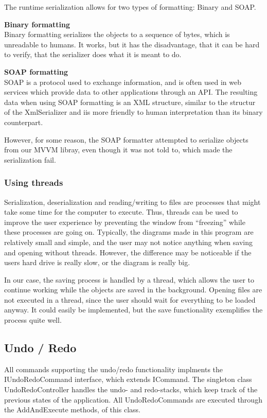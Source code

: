 
The runtime serialization allows for two types of formatting: Binary and SOAP.

\textbf{Binary formatting}\\
Binary formatting serializes the objects to a sequence of bytes, which is unreadable to humans. It works, but it has the disadvantage, that it can be hard to verify, that the serializer does what it is meant to do.

\textbf{SOAP formatting}\\
SOAP is a protocol used to exchange information, and is often used in web services which provide data to other applications through an API. The resulting data when using SOAP formatting is an XML structure, similar to the structur of the XmlSerializer and iis more friendly to human interpretation than its binary counterpart.

However, for some reason, the SOAP formatter attempted to serialize objects from our MVVM libray, even though it was not told to, which made the serialization fail.

\subsubsection{Using threads}
Serialization, deserialization and reading/writing to files are processes that might take some time for the computer to execute. Thus, threads can be used to improve the user experience by preventing the window from “freezing” while these processes are going on. Typically, the diagrams made in this program are relatively small and simple, and the user may not notice anything when saving and opening without threads. However, the difference may be noticeable if the users hard drive is really slow, or the diagram is really big.

In our case, the saving process is handled by a thread, which allows the user to continue working while the objects are saved in the background. Opening files are not executed in a thread, since the user should wait for everything to be loaded anyway. It could easily be implemented, but the save functionality exemplifies the process quite well.


\subsection{Undo / Redo}
All commands supporting the undo/redo functionality implments the IUndoRedoCommand interface, which extends ICommand. The singleton class UndoRedoController handles the undo- and redo-stacks, which keep track of the previous states of the application. All UndoRedoCommands are executed through the AddAndExecute methods, of this class.

